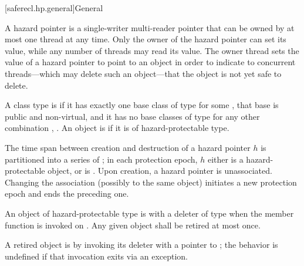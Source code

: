 [saferecl.hp.general]{General}

\pnum
{}%
A hazard pointer is a single-writer multi-reader pointer
that can be owned by at most one thread at any time.
Only the owner of the hazard pointer can set its value,
while any number of threads may read its value.
The owner thread sets the value of a hazard pointer to point to an object
in order to indicate to concurrent threads---which
may delete such an object---that
the object is not yet safe to delete.

\pnum
A class type  is 
if it has exactly one base class of type 
for some ,
that base is public and non-virtual, and
it has no base classes of type 
for any other combination , .
An object is  if it is of hazard-protectable type.

\pnum
The time span between creation and destruction of a hazard pointer $h$
is partitioned into a series of ;
in each protection epoch,
$h$ either is 
a hazard-protectable object, or is .
Upon creation, a hazard pointer is unassociated.
Changing the association (possibly to the same object)
initiates a new protection epoch and ends the preceding one.

\pnum
An object  of hazard-protectable type  is
 with a deleter of type 
when the member function 
is invoked on .
Any given object  shall be retired at most once.

\pnum
A retired object  is 
by invoking its deleter with a pointer to ;
the behavior is undefined if that invocation exits via an exception.

